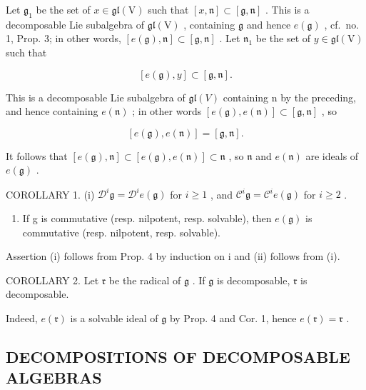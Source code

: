 Let \(\mathfrak{g}_1\) be the set of \(x\in \mathfrak{gl}(\mathrm{V})\) such that \([x,\mathfrak{n}]\subset [\mathfrak{g},\mathfrak{n}]\) . This is a decomposable Lie subalgebra of \(\mathfrak{gl}(\mathrm{V})\) , containing \(\mathfrak{g}\) and hence \(e(\mathfrak{g})\) , cf.~no. 1, Prop. 3; in other words, \([e(\mathfrak{g}),\mathfrak{n}]\subset [\mathfrak{g},\mathfrak{n}]\) . Let \(\mathfrak{n}_1\) be the set of \(y\in \mathfrak{gl}(\mathrm{V})\) such that

\[
[ e (\mathfrak {g}), y ] \subset [ \mathfrak {g}, \mathfrak {n} ].
\]

This is a decomposable Lie subalgebra of \(\mathfrak{gl}(V)\) containing n by the preceding, and hence containing \(e(\mathfrak{n})\) ; in other words \([e(\mathfrak{g}), e(\mathfrak{n})] \subset [\mathfrak{g}, \mathfrak{n}]\) , so

\[
[ e (\mathfrak {g}), e (\mathfrak {n}) ] = [ \mathfrak {g}, \mathfrak {n} ].
\]

It follows that \([e(\mathfrak{g}),\mathfrak{n}]\subset [e(\mathfrak{g}),e(\mathfrak{n})]\subset \mathfrak{n}\) , so \(\mathfrak{n}\) and \(e(\mathfrak{n})\) are ideals of \(e(\mathfrak{g})\) .

COROLLARY 1. (i) \(\mathcal{D}^i\mathfrak{g} = \mathcal{D}^i e(\mathfrak{g})\) for \(i\geq 1\) , and \(\mathcal{C}^i\mathfrak{g} = \mathcal{C}^i e(\mathfrak{g})\) for \(i\geq 2\) .

\begin{enumerate}
\def\labelenumi{(\roman{enumi})}
\setcounter{enumi}{1}
\tightlist
\item
  If g is commutative (resp. nilpotent, resp. solvable), then \(e(\mathfrak{g})\) is commutative (resp. nilpotent, resp. solvable).
\end{enumerate}

Assertion (i) follows from Prop. 4 by induction on i and (ii) follows from (i).

COROLLARY 2. Let \(\mathfrak{r}\) be the radical of \(\mathfrak{g}\) . If \(\mathfrak{g}\) is decomposable, \(\mathfrak{r}\) is decomposable.

Indeed, \(e(\mathfrak{r})\) is a solvable ideal of \(\mathfrak{g}\) by Prop. 4 and Cor. 1, hence \(e(\mathfrak{r}) = \mathfrak{r}\) .

\subsection{DECOMPOSITIONS OF DECOMPOSABLE ALGEBRAS}

